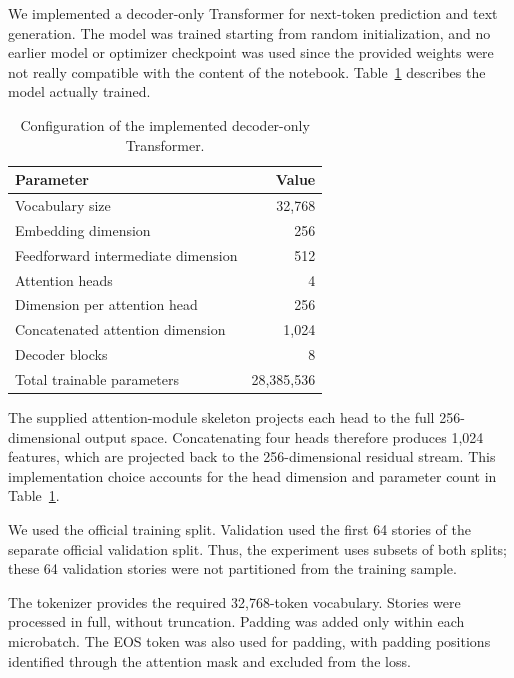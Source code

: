 \documentclass[a4paper, 12pt]{article}
\begin{document}
We implemented a decoder-only Transformer for next-token prediction and text generation. The model was trained starting from random initialization, and no earlier model or optimizer checkpoint was used since the provided weights were not really compatible with the content of the notebook. Table~\ref{tab:model-config} describes the
model actually trained.

\begin{table}[htbp]
    \centering
    \caption{Configuration of the implemented decoder-only Transformer.}
    \label{tab:model-config}
    \begin{tabular}{lr}
        \toprule
        Parameter & Value \\
        \midrule
        Vocabulary size & 32,768 \\
        Embedding dimension & 256 \\
        Feedforward intermediate dimension & 512 \\
        Attention heads & 4 \\
        Dimension per attention head & 256 \\
        Concatenated attention dimension & 1,024 \\
        Decoder blocks & 8 \\
        Total trainable parameters & 28,385,536 \\
        \bottomrule
    \end{tabular}
\end{table}

The supplied attention-module skeleton projects each head to the full 256-dimensional output space. Concatenating four heads therefore produces 1,024 features, which are projected back to the 256-dimensional residual stream. This implementation choice accounts for the head dimension and parameter count in Table~\ref{tab:model-config}.

We used the  official training split. Validation used the first 64 stories of the separate official
validation split. Thus, the experiment uses subsets of both splits;
these 64 validation stories were not partitioned from the training sample.

The  tokenizer provides the required
32,768-token vocabulary. Stories were processed in full, without
truncation. Padding was added only
within each microbatch. The EOS token was also used for padding,
with padding positions identified through the attention mask and
excluded from the loss.
\end{document}
